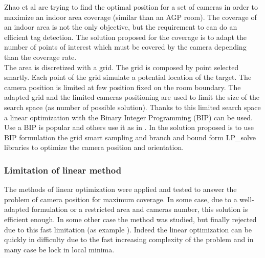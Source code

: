 Zhao  et al \cite{22*zhao2008} are trying to find the optimal position for a set of cameras in order to maximize an indoor area coverage (similar than an AGP room). The coverage of an indoor area is not the only objective, but the requirement to can  do an efficient tag detection.
The solution proposed for the coverage is to adapt the number of points of interest which must be covered by the camera depending than the coverage rate. \\
The area is discretized with a grid.  The grid is composed by point selected smartly. Each point of the grid simulate a potential location of the target.
The camera position is limited at few position fixed on the room boundary.
The adapted grid and the limited cameras positioning are used to limit the size of the search space (as number of possible solution). Thanks to this limited search space a linear optimization with the Binary Integer Programming (BIP) can be used. \\
Use a BIP is popular and others use it as in \cite{22*zhao2008,43*erdem2006}. In \cite{22*zhao2008} the solution proposed is to use BIP formulation the grid smart sampling and branch and bound form LP\_solve libraries to optimize the camera position and orientation.\\


\subsubsection{Limitation of linear method}
The methods of linear optimization were applied and tested to answer the problem of camera position for maximum coverage. In some case, due to a well-adapted formulation or a restricted area and cameras number, this solution is efficient enough. In some other case the method was studied, but finally rejected due to this fast limitation (as example \cite{141*akbarzadeh2013,151*zhao2013,82*chrysostomou2012}). Indeed the linear optimization can be quickly in difficulty due to the fast increasing complexity of the problem and in many case be lock in local minima.

